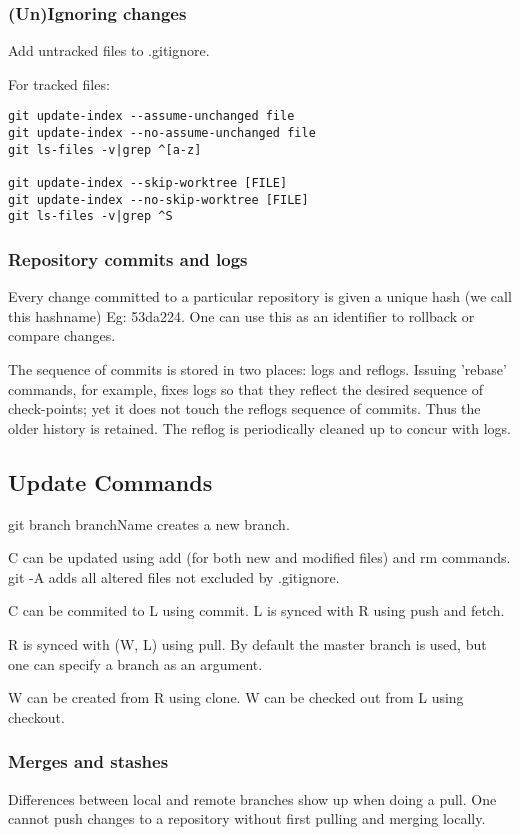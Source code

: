 \documentclass[oneside, article]{memoir}
\begin{document}
\subsubsection{(Un)Ignoring changes}
Add untracked files to .gitignore.

For tracked files:
\begin{verbatim}
git update-index --assume-unchanged file
git update-index --no-assume-unchanged file
git ls-files -v|grep ^[a-z]

git update-index --skip-worktree [FILE]
git update-index --no-skip-worktree [FILE]
git ls-files -v|grep ^S

\end{verbatim}


\subsubsection{Repository commits and logs}
Every change committed to a particular repository is given a unique hash (we call this hashname) Eg: 53da224. One can use this as an identifier to rollback or compare changes.

The sequence of commits is stored in two places: logs and reflogs. Issuing 'rebase' commands, for example, fixes logs so that they reflect the desired sequence of check-points; yet it does not touch the reflogs sequence of commits. Thus the older history is retained. The reflog is periodically cleaned up to concur with logs.

\subsection{Update Commands}
git branch branchName creates a new branch.

C can be updated using add (for both new and modified files) and rm commands. git -A adds all altered files not excluded by .gitignore.

C can be commited to L using commit. L is synced with R using push and fetch.

R is synced with (W, L) using pull. By default the master branch is used, but one can specify a branch as an argument.

W can be created from R using clone. W can be checked out from L using checkout.

\subsubsection{Merges and stashes}
Differences between local and remote branches show up when doing a pull. One cannot push changes to a repository without first pulling and merging locally.
\end{document}
